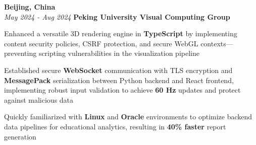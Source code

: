 \vspace{0.2cm}

\begin{twocolentry}{
    \textbf{Beijing, China} \\
    \textit{May 2024 - Aug 2024}
}{
    \textbf{Peking University Visual Computing Group} \\
}
\end{twocolentry}
\begin{onecolentry}
    \begin{highlights}
        \item Enhanced a versatile 3D rendering engine in \textbf{TypeScript} by implementing content security policies, CSRF protection, and secure WebGL contexts—preventing scripting vulnerabilities in the visualization pipeline
        \item Established secure \textbf{WebSocket} communication with TLS encryption and \textbf{MessagePack} serialization between Python backend and React frontend, implementing robust input validation to achieve \textbf{60 Hz} updates and protect against malicious data
        \item Quickly familiarized with \textbf{Linux} and \textbf{Oracle} environments to optimize backend data pipelines for educational analytics, resulting in \textbf{40\% faster} report generation
    \end{highlights}
\end{onecolentry}

